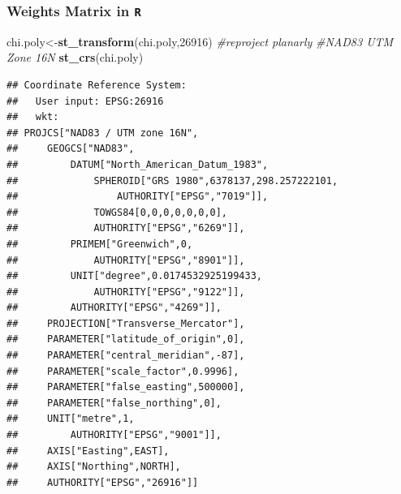 \documentclass[
  shownotes,
  xcolor={svgnames},
  hyperref={colorlinks,citecolor=DarkBlue,linkcolor=DarkRed,urlcolor=DarkBlue}
   , aspectratio=169]{beamer}
\newenvironment{Shaded}{\begin{snugshade}}{\end{snugshade}}
\newcommand{\CommentTok}[1]{\textcolor[rgb]{0.56,0.35,0.01}{\textit{#1}}}
\newcommand{\DecValTok}[1]{\textcolor[rgb]{0.00,0.00,0.81}{#1}}
\newcommand{\KeywordTok}[1]{\textcolor[rgb]{0.13,0.29,0.53}{\textbf{#1}}}
\newcommand{\NormalTok}[1]{#1}
\begin{document}
\begin{frame}[fragile]
\frametitle{Weights Matrix in \texttt{R}}

\begin{scriptsize}

\begin{Shaded}
\begin{Highlighting}[]
\NormalTok{chi.poly\textless{}{-}}\KeywordTok{st\_transform}\NormalTok{(chi.poly,}\DecValTok{26916}\NormalTok{) }\CommentTok{\#reproject planarly}
\CommentTok{\#NAD83 UTM Zone 16N}
\KeywordTok{st\_crs}\NormalTok{(chi.poly)}
\end{Highlighting}
\end{Shaded}
\end{scriptsize}
\begin{tiny}
\begin{verbatim}
## Coordinate Reference System:
##   User input: EPSG:26916 
##   wkt:
## PROJCS["NAD83 / UTM zone 16N",
##     GEOGCS["NAD83",
##         DATUM["North_American_Datum_1983",
##             SPHEROID["GRS 1980",6378137,298.257222101,
##                 AUTHORITY["EPSG","7019"]],
##             TOWGS84[0,0,0,0,0,0,0],
##             AUTHORITY["EPSG","6269"]],
##         PRIMEM["Greenwich",0,
##             AUTHORITY["EPSG","8901"]],
##         UNIT["degree",0.0174532925199433,
##             AUTHORITY["EPSG","9122"]],
##         AUTHORITY["EPSG","4269"]],
##     PROJECTION["Transverse_Mercator"],
##     PARAMETER["latitude_of_origin",0],
##     PARAMETER["central_meridian",-87],
##     PARAMETER["scale_factor",0.9996],
##     PARAMETER["false_easting",500000],
##     PARAMETER["false_northing",0],
##     UNIT["metre",1,
##         AUTHORITY["EPSG","9001"]],
##     AXIS["Easting",EAST],
##     AXIS["Northing",NORTH],
##     AUTHORITY["EPSG","26916"]]
\end{verbatim}

\end{tiny}
\end{frame}
\end{document}
